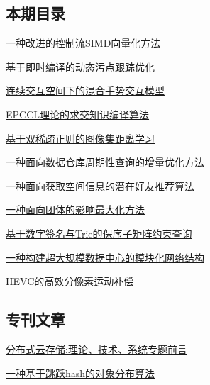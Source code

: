 \documentclass[a4paper]{article}
\begin{document}
\subsection{本期目录}
\href{http://www.jos.org.cn/ch/reader/create_pdf.aspx?file_no=5121&year_id=2017&quarter_id=8&falg=1}{一种改进的控制流SIMD向量化方法}

\href{http://www.jos.org.cn/ch/reader/create_pdf.aspx?file_no=5126&year_id=2017&quarter_id=8&falg=1}{基于即时编译的动态污点跟踪优化}

\href{http://www.jos.org.cn/ch/reader/create_pdf.aspx?file_no=5123&year_id=2017&quarter_id=8&falg=1}{连续交互空间下的混合手势交互模型}

\href{http://www.jos.org.cn/ch/reader/create_pdf.aspx?file_no=5125&year_id=2017&quarter_id=8&falg=1}{EPCCL理论的求交知识编译算法}

\href{http://www.jos.org.cn/ch/reader/create_pdf.aspx?file_no=5135&year_id=2017&quarter_id=8&falg=1}{基于双稀疏正则的图像集距离学习}

\href{http://www.jos.org.cn/ch/reader/create_pdf.aspx?file_no=5107&year_id=2017&quarter_id=8&falg=1}{一种面向数据仓库周期性查询的增量优化方法}

\href{http://www.jos.org.cn/ch/reader/create_pdf.aspx?file_no=5118&year_id=2017&quarter_id=8&falg=1}{一种面向获取空间信息的潜在好友推荐算法}

\href{http://www.jos.org.cn/ch/reader/create_pdf.aspx?file_no=5120&year_id=2017&quarter_id=8&falg=1}{一种面向团体的影响最大化方法}

\href{http://www.jos.org.cn/ch/reader/create_pdf.aspx?file_no=5124&year_id=2017&quarter_id=8&falg=1}{基于数字签名与Trie的保序子矩阵约束查询}

\href{http://www.jos.org.cn/ch/reader/create_pdf.aspx?file_no=5119&year_id=2017&quarter_id=8&falg=1}{一种构建超大规模数据中心的模块化网络结构}

\href{http://www.jos.org.cn/ch/reader/create_pdf.aspx?file_no=5122&year_id=2017&quarter_id=8&falg=1}{HEVC的高效分像素运动补偿}

\subsection{专刊文章}
\href{http://www.jos.org.cn/ch/reader/create_pdf.aspx?file_no=5205&year_id=2017&quarter_id=8&falg=1}{分布式云存储:理论、技术、系统专题前言}

\href{http://www.jos.org.cn/ch/reader/create_pdf.aspx?file_no=5200&year_id=2017&quarter_id=8&falg=1}{一种基于跳跃hash的对象分布算法}
\end{document}

